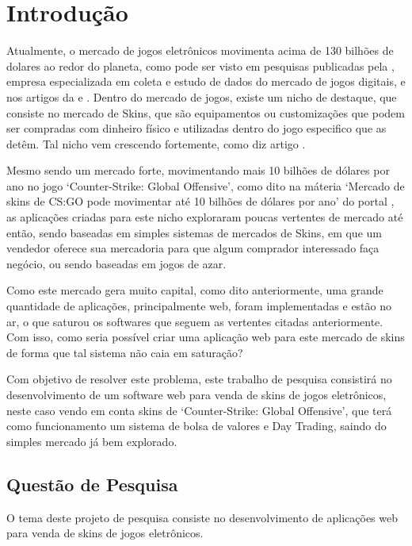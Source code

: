 
\chapter[Introdução]{Introdução}
Atualmente, o mercado de jogos eletrônicos movimenta acima de 130 bilhões de dolares ao redor do planeta, como pode ser visto em pesquisas publicadas pela , empresa especializada em coleta e estudo de dados do mercado de jogos digitais, e nos artigos da  e . Dentro do mercado de jogos, existe um nicho de destaque, que consiste no mercado de Skins, que são equipamentos ou customizações que podem ser compradas com dinheiro físico e utilizadas dentro do jogo especifico que as detêm. Tal nicho vem crescendo fortemente, como diz artigo .

Mesmo sendo um mercado forte, movimentando mais 10 bilhões de dólares por ano no jogo ‘Counter-Strike: Global Offensive’, como dito na máteria ‘Mercado de skins de CS:GO pode movimentar até 10 bilhões de dólares por ano’ do portal , as aplicações criadas para este nicho exploraram poucas vertentes de mercado até então, sendo baseadas em simples sistemas de mercados de Skins, em que um vendedor oferece sua mercadoria para que algum comprador interessado faça negócio, ou sendo baseadas em jogos de azar.

Como este mercado gera muito capital, como dito anteriormente, uma grande quantidade de aplicações, principalmente web, foram implementadas e estão no ar, o que saturou os softwares que seguem as vertentes citadas anteriormente. Com isso, como seria possível criar uma aplicação web para este mercado de skins de forma que tal sistema não caia em saturação?

Com objetivo de resolver este problema, este trabalho de pesquisa consistirá no desenvolvimento de um software web para venda de skins de jogos eletrônicos, neste caso vendo em conta skins de ‘Counter-Strike: Global Offensive’, que terá como funcionamento um sistema de bolsa de valores e Day Trading, saindo do simples mercado já bem explorado.

\section{Questão de Pesquisa}
O tema deste projeto de pesquisa consiste no desenvolvimento de aplicações web para venda de skins de jogos eletrônicos.

